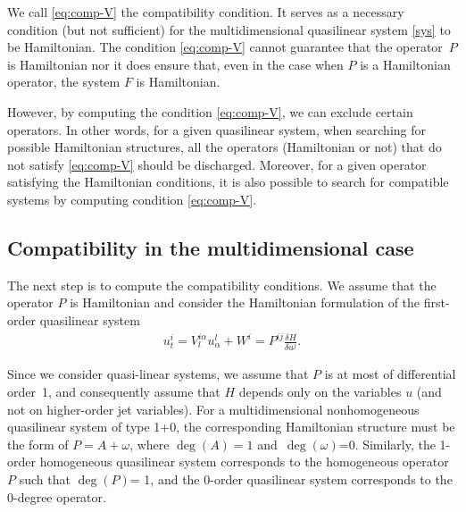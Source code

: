 \documentclass[10pt,a4paper]{amsart}
\numberwithin{equation}{section}
\begin{document}
We call \eqref{eq:comp-V} the compatibility condition. It serves as a necessary condition (but not sufficient) for the multidimensional quasilinear system \eqref{sys} to be Hamiltonian. The condition \eqref{eq:comp-V} cannot guarantee that the operator~$P$ is Hamiltonian nor it does ensure that, even in the case when $P$ is a Hamiltonian operator, the system $F$ is Hamiltonian.

However, by computing the condition \eqref{eq:comp-V}, we can exclude certain operators. In other words, for a given quasilinear system, when searching for possible Hamiltonian structures, all the operators (Hamiltonian or not) that do not satisfy \eqref{eq:comp-V} should be discharged. Moreover, for a given operator satisfying the Hamiltonian conditions, it is also possible to search for compatible systems by computing condition \eqref{eq:comp-V}.

\subsection{Compatibility in the multidimensional case}
The next step is to compute the compatibility conditions. We assume that the operator $P$ is Hamiltonian and consider the Hamiltonian formulation of the first-order quasilinear system
\begin{gather*}
u^i_t=V^{i\alpha}_lu^l_\alpha+W^i=P^{ij}\frac{\delta H}{\delta u^j}.
\end{gather*}

Since we consider quasi-linear systems, we assume that $P$ is at most of differential order~1, and consequently assume that $H$ depends only on the variables $u$ (and not on higher-order jet variables). For a multidimensional nonhomogeneous quasilinear system of type 1+0, the corresponding Hamiltonian structure must be the form of $P=A+\omega$, where $\operatorname{deg}(A)=1$ and~$\operatorname{deg}(\omega)$=0. Similarly, the 1-order homogeneous quasilinear system corresponds to the homogeneous operator $P$ such that $\operatorname{deg}(P)$= 1, and the 0-order quasilinear system corresponds to the 0-degree operator.
\end{document}
